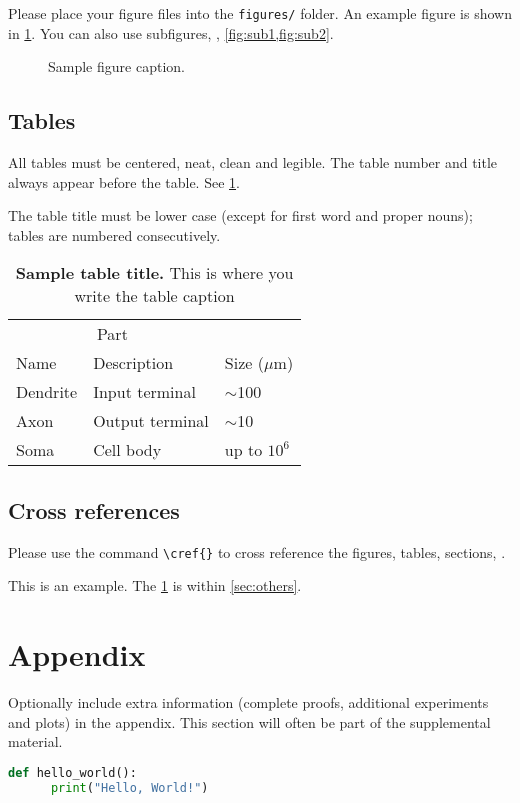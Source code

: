 \documentclass{article}
\begin{document}
Please place your figure files into the \verb+figures/+ folder. An example figure is shown in \cref{fig:sample}. You can also use subfigures, \eg, \cref{fig:sub1,fig:sub2}.

\begin{figure}[ht!]
    \centering
    \fbox{\rule[-.5cm]{0cm}{4cm} \rule[-.5cm]{4cm}{0cm}}
    \caption{Sample figure caption.}
    \label{fig:sample}
\end{figure}

\subsection{Tables}

All tables must be centered, neat, clean and legible. The table number and title always appear before the table. See \cref{tab:sample}.

The table title must be lower case (except for first word and proper nouns); tables are numbered consecutively.

\begin{table}
    \caption{\textbf{Sample table title.} This is where you write the table caption}
    \label{tab:sample}
    \centering
    \begin{tabular}{lll}
        \toprule
        \multicolumn{2}{c}{Part}                   \\
        \cmidrule(r){1-2}
        Name     & Description     & Size ($\mu$m) \\
        \midrule
        Dendrite & Input terminal  & $\sim$100     \\
        Axon     & Output terminal & $\sim$10      \\
        Soma     & Cell body       & up to $10^6$  \\
        \bottomrule
    \end{tabular}
\end{table}

\subsection{Cross references}

Please use the command \verb+\cref{}+ to cross reference the figures, tables, sections, \etc.

This is an example. The \cref{fig:sample} is within \cref{sec:others}.




\appendix

\section{Appendix}

Optionally include extra information (complete proofs, additional experiments and plots) in the appendix. This section will often be part of the supplemental material.


\begin{lstlisting}[language=Python]
  def hello_world():
      print("Hello, World!")
\end{lstlisting}
\end{document}
